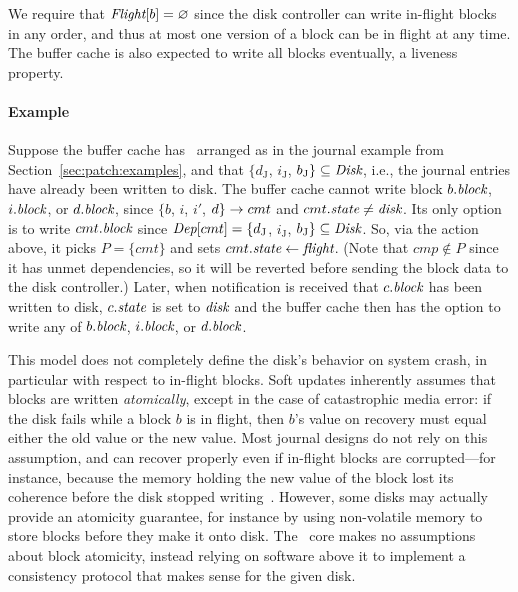 \noindent
%
We require that $\PInf[b] = \emptyset$ since the disk controller can write
in-flight blocks in any order, and thus at most one version of a block can
be in flight at any time.
%
The buffer cache is also expected to write all blocks eventually, a
 liveness property.

\paragraph{Example}
%
Suppose the buffer cache has \patches\ arranged as in the journal example from
Section~\ref{sec:patch:examples}, and that $\{d_\textrm{J}$, $i_\textrm{J}$,
$b_\textrm{J}\} \subseteq \PDisk$, i.e., the journal entries have already been
written to disk.
%
The buffer cache cannot write block $b.\textit{block}$, $i.\textit{block}$, or $d.\textit{block}$,
since $\{b$, $i$, $i'$, $d\} \rightarrow cmt$ and $cmt.\textit{state} \neq \textit{disk}$.
%
Its only option is to write $cmt.\textit{block}$ since $\textit{Dep}[cmt] =
\{d_\textrm{J}$, $i_\textrm{J}$, $b_\textrm{J}\} \subseteq \PDisk$.
%
So, via the action above, it picks $P = \{cmt\}$ and sets $cmt.\textit{state} \gets
\textit{flight}$. (Note that $cmp \not \in P$ since it has unmet dependencies, so it
will be reverted before sending the block data to the disk controller.)
%
Later, when notification is received that $c.\textit{block}$ has been written to disk,
$c.\textit{state}$ is set to $\textit{disk}$ and the buffer cache then has the option to
write any of $b.\textit{block}$, $i.\textit{block}$, or $d.\textit{block}$.

This model does not completely define the disk's behavior on system crash,
 in particular with respect to in-flight blocks.
%
Soft updates inherently assumes that blocks are written
\emph{atomically}, except in the case of catastrophic media error:
%
if the disk fails while a block $b$ is in flight, then $b$'s
value on recovery must equal either the old value or the new value.
%
Most journal designs do not rely on this assumption, and can recover
 properly even if in-flight blocks are corrupted---for instance,
 because the memory holding the new value of the block lost its coherence
 before the disk stopped writing~\cite{nightingale06rethink}.
%
However, some disks may actually provide an atomicity guarantee, for
 instance by using non-volatile memory to store blocks before they make it
 onto disk.
%
The \Kudos\ core makes no assumptions about block atomicity, instead relying
 on software above it to implement a consistency protocol that makes sense
 for the given disk.


